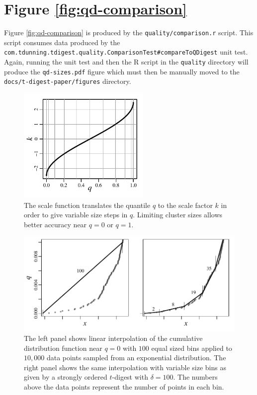 \documentclass[]{statsoc}
\begin{document}
\section{Figure \ref{fig:qd-comparison}}
Figure \ref{fig:qd-comparison} is produced by the {\tt quality/comparison.r} script. This script consumes data produced by the {\tt com.tdunning.tdigest.quality.ComparisonTest\#compareToQDigest} unit test. Again, running the unit test and then the R script in the {\tt quality} directory will produce the {\tt qd-sizes.pdf} figure which must then be manually moved to the {\tt docs/t-digest-paper/figures} directory.
\begin{figure}[p] %
   \centering
   \includegraphics[width=2.5in]{figures/k-q-plot.pdf} 
   \caption{The scale function translates the quantile $q$ to the scale factor $k$ in order to give variable size steps in $q$. Limiting cluster sizes allows better accuracy near $q=0$ or $q=1$. }
   \label{fig:k-q-plot}
\end{figure}
\begin{figure}[p] %
   \centering
   \includegraphics[height=2.in, clip]{figures/linear-interpolation.pdf} 
   \caption{The left panel shows linear interpolation of the cumulative distribution function near $q=0$ with $100$ equal sized bins applied to $10,000$ data points sampled from an exponential distribution. The right panel shows the same interpolation with variable size bins as given by a strongly ordered $t$-digest with $\delta=100$. The numbers above the data points represent the number of points in each bin. }
   \label{fig:linear-interpolation}
\end{figure}
\end{document}
